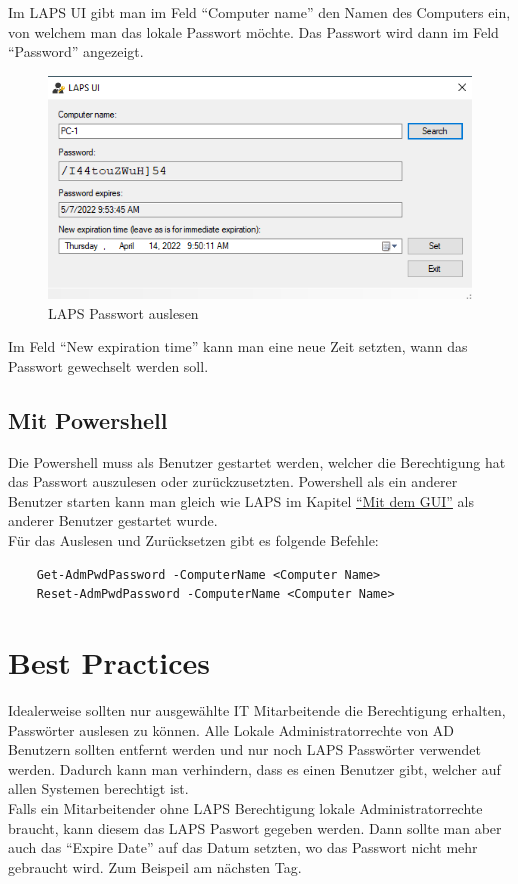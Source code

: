 Im LAPS UI gibt man im Feld ``Computer name'' den Namen des Computers ein, von welchem man das lokale Passwort möchte.
Das Passwort wird dann im Feld ``Password'' angezeigt.
\begin{figure}[H]
    \centering
    \includegraphics[width=0.7\linewidth]{../img/LAPS/Laps-ui.png}
    \caption{LAPS Passwort auslesen}
\end{figure}
Im Feld ``New expiration time'' kann man eine neue Zeit setzten, wann das Passwort gewechselt werden soll.

\subsection{Mit Powershell}
Die Powershell muss als Benutzer gestartet werden, welcher die Berechtigung hat das Passwort auszulesen oder zurückzusetzten.
Powershell als ein anderer Benutzer starten kann man gleich wie LAPS im Kapitel \hyperref[subsec:laps-gui-usage]{``Mit dem GUI''} als anderer Benutzer gestartet wurde.\\

Für das Auslesen und Zurücksetzen gibt es folgende Befehle:
\begin{lstlisting}
    Get-AdmPwdPassword -ComputerName <Computer Name>
    Reset-AdmPwdPassword -ComputerName <Computer Name>
\end{lstlisting}


\section{Best Practices}
Idealerweise sollten nur ausgewählte IT Mitarbeitende die Berechtigung erhalten, Passwörter auslesen zu können.
Alle Lokale Administratorrechte von AD Benutzern sollten entfernt werden und nur noch LAPS Passwörter verwendet werden.
Dadurch kann man verhindern, dass es einen Benutzer gibt, welcher auf allen Systemen berechtigt ist.\\

Falls ein Mitarbeitender ohne LAPS Berechtigung lokale Administratorrechte braucht, kann diesem das LAPS Paswort gegeben werden.
Dann sollte man aber auch das ``Expire Date'' auf das Datum setzten, wo das Passwort nicht mehr gebraucht wird.
Zum Beispeil am nächsten Tag.

